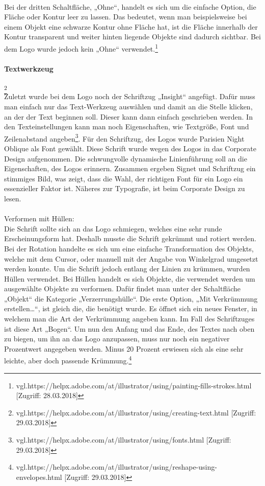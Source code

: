 \leavevmode \\
Bei der dritten Schaltfläche, „Ohne“, handelt es sich um die einfache Option, die Fläche oder Kontur leer zu lassen. Das bedeutet, wenn man beispielsweise bei einem Objekt eine schwarze Kontur ohne Fläche hat, ist die Fläche innerhalb der Kontur transparent und weiter hinten liegende Objekte sind dadurch sichtbar. Bei dem Logo wurde jedoch kein „Ohne“ verwendet.\footnote{\label{} vgl.https://helpx.adobe.com/at/illustrator/using/painting-fills-strokes.html [Zugriff: 28.03.2018]}

\paragraph{Textwerkzeug}\footnote{\label{} vgl.https://helpx.adobe.com/at/illustrator/using/creating-text.html [Zugriff: 29.03.2018]}
\leavevmode \\
Zuletzt wurde bei dem Logo noch der Schriftzug „Insight“ angefügt. Dafür muss man einfach nur das Text-Werkzeug auswählen und damit an die Stelle klicken, an der der Text beginnen soll. Dieser kann dann einfach geschrieben werden. In den Texteinstellungen kann man noch Eigenschaften, wie Textgröße, Font und Zeilenabstand angeben\footnote{\label{} vgl.https://helpx.adobe.com/at/illustrator/using/fonts.html [Zugriff: 29.03.2018]}.
Für den Schriftzug, des Logos wurde Parisien Night Oblique als Font gewählt. Diese Schrift wurde wegen des Logos in das Corporate Design aufgenommen. Die schwungvolle dynamische Linienführung soll an die Eigenschaften, des Logos erinnern. Zusammen ergeben Signet und Schriftzug ein stimmiges Bild, was zeigt, dass die Wahl, der richtigen Font für ein Logo ein essenzieller Faktor ist. Näheres zur Typografie, ist beim Corporate Design zu lesen.
\leavevmode \\
\leavevmode \\
Verformen mit Hüllen:
\leavevmode \\
Die Schrift sollte sich an das Logo schmiegen, welches eine sehr runde Erscheinungsform hat. Deshalb musste die Schrift gekrümmt und rotiert werden. Bei der Rotation handelte es sich um eine einfache Transformation des Objekts, welche mit dem Cursor, oder manuell mit der Angabe von Winkelgrad umgesetzt werden konnte. Um die Schrift jedoch entlang der Linien zu krümmen, wurden Hüllen verwendet. Bei Hüllen handelt es sich Objekte, die verwendet werden um ausgewählte Objekte zu verformen. Dafür findet man unter der Schaltfläche „Objekt“ die Kategorie „Verzerrungshülle“. Die erste Option, „Mit Verkrümmung erstellen…“, ist gleich die, die benötigt wurde. Es öffnet sich ein neues Fenster, in welchem man die Art der Verkrümmung angeben kann. Im Fall des Schriftzuges ist diese Art „Bogen“. Um nun den Anfang und das Ende, des Textes nach oben zu biegen, um ihn an das Logo anzupassen, muss nur noch ein negativer Prozentwert angegeben werden. Minus 20 Prozent erwiesen sich als eine sehr leichte, aber doch passende Krümmung.\footnote{\label{} vgl.https://helpx.adobe.com/at/illustrator/using/reshape-using-envelopes.html [Zugriff: 29.03.2018]}
